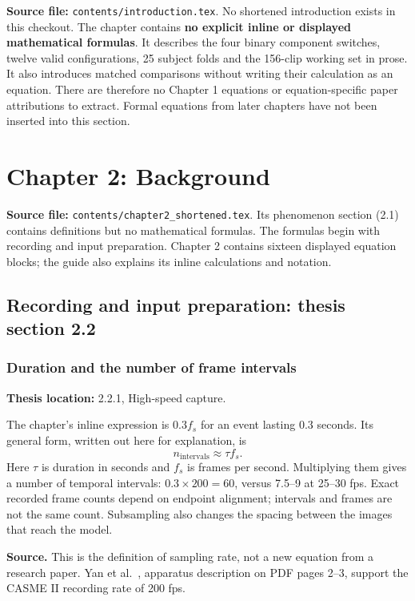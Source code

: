 \documentclass[11pt,a4paper]{article}
\numberwithin{equation}{section}
\begin{document}
\textbf{Source file:} \texttt{contents/introduction.tex}. No shortened
introduction exists in this checkout. The chapter contains \textbf{no explicit
inline or displayed mathematical formulas}. It describes the four binary
component switches, twelve valid configurations, 25 subject folds and the
156-clip working set in prose. It also introduces matched comparisons without
writing their calculation as an equation. There are therefore no Chapter 1
equations or equation-specific paper attributions to extract. Formal equations
from later chapters have not been inserted into this section.

\section{Chapter 2: Background}
\label{fg:chapter2}

\textbf{Source file:} \texttt{contents/chapter2\_shortened.tex}. Its phenomenon
section (2.1) contains definitions but no mathematical formulas. The formulas
begin with recording and input preparation. Chapter 2 contains sixteen displayed
equation blocks; the guide also explains its inline calculations and notation.

\subsection{Recording and input preparation: thesis section 2.2}

\subsubsection{Duration and the number of frame intervals}
\label{fg:capture}
\textbf{Thesis location:} 2.2.1, High-speed capture.

The chapter's inline expression is $0.3f_s$ for an event lasting $0.3$ seconds.
Its general form, written out here for explanation, is
\begin{equation}
    n_{\mathrm{intervals}}\approx \tau f_s.
    \label{fg:eq:capture}
\end{equation}
Here $\tau$ is duration in seconds and $f_s$ is frames per second. Multiplying
them gives a number of temporal intervals: $0.3\times200=60$, versus 7.5--9 at
25--30 fps. Exact recorded frame counts depend on endpoint alignment; intervals
and frames are not the same count. Subsampling also changes the spacing between
the images that reach the model.

\textbf{Source.} This is the definition of sampling rate, not a new equation
from a research paper. Yan et al.~\cite{yan2014}, apparatus description on PDF
pages 2--3, support the CASME II recording rate of 200 fps.
\end{document}
